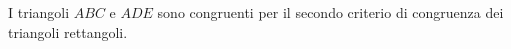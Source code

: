 I triangoli $ABC$ e $ADE$ sono congruenti per il secondo 
criterio di congruenza dei triangoli rettangoli.